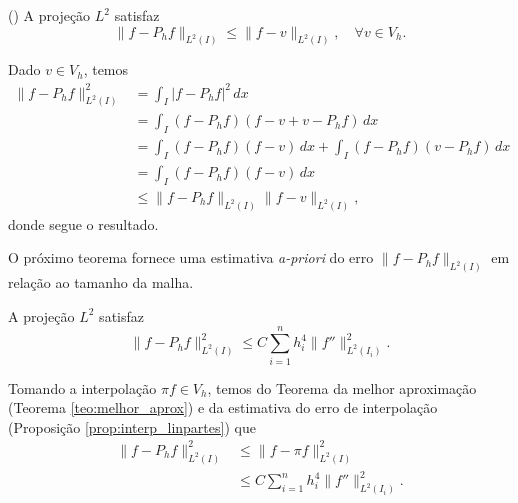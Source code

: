 \begin{teo}()\label{teo:melhor_aprox}
  A projeção $L^2$ satisfaz
  \begin{equation}
    \|f-P_hf\|_{L^2(I)} \leq \|f - v\|_{L^2(I)},\quad\forall v\in V_h.
  \end{equation}
\end{teo}
\begin{dem}
  Dado $v\in V_h$, temos
  \begin{align}
    \|f-P_hf\|_{L^2(I)}^2 &= \int_I |f-P_hf|^2\,dx\\
    &= \int_I (f-P_hf)(f-v+v-P_hf)\,dx\\
    &= \int_I(f-P_hf)(f-v)\,dx + \int_I(f-P_hf)(v-P_hf)\,dx\\
    &= \int_I (f-P_hf)(f-v)\,dx\\
    &\leq \|f-P_hf\|_{L^2(I)}\|f-v\|_{L^2(I)},
  \end{align}
donde segue o resultado.
\end{dem}

O próximo teorema fornece uma estimativa \textit{a-priori} do erro $\|f-P_h f\|_{L^2(I)}$ em relação ao tamanho da malha.

\begin{teo}\label{teo:erro_proj_1d}
  A projeção $L^2$ satisfaz
  \begin{equation}
    \|f-P_hf\|_{L^2(I)}^2 \leq C\sum_{i=1}^n h_i^4\|f''\|_{L^2(I_i)}^2.
  \end{equation}
\end{teo}
\begin{dem}
  Tomando a interpolação $\pi f \in V_h$, temos do Teorema da melhor aproximação (Teorema \ref{teo:melhor_aprox}) e da estimativa do erro de interpolação (Proposição \ref{prop:interp_linpartes}) que
  \begin{align}
    \|f - P_hf\|_{L^2(I)}^2 &\leq \|f-\pi f\|_{L^2(I)}^2\\
    &\leq C\sum_{i=1}^n h_i^4\|f''\|_{L^2(I_i)}^2.
  \end{align}
\end{dem}



